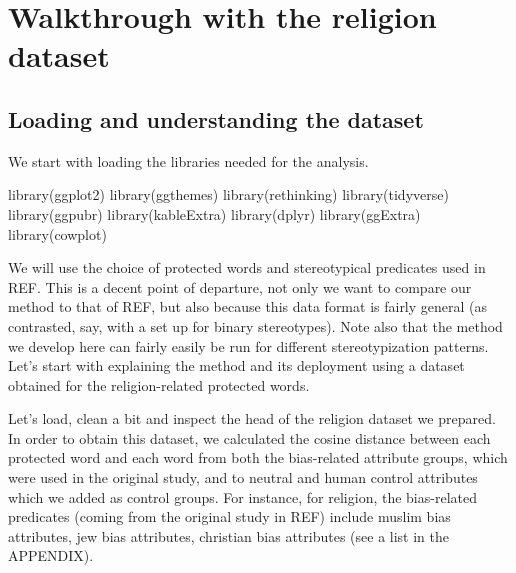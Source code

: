 \documentclass[
  12pt,
]{book}
\newenvironment{Shaded}{\begin{snugshade}}{\end{snugshade}}
\newcommand{\FunctionTok}[1]{\textcolor[rgb]{0.00,0.00,0.00}{#1}}
\newcommand{\NormalTok}[1]{#1}
\begin{document}
\hypertarget{walkthrough-with-the-religion-dataset}{%
\chapter{Walkthrough with the religion dataset}\label{walkthrough-with-the-religion-dataset}}

\hypertarget{loading-and-understanding-the-dataset}{%
\section{Loading and understanding the dataset}\label{loading-and-understanding-the-dataset}}

We start with loading the libraries needed for the analysis.

\footnotesize

\begin{Shaded}
\begin{Highlighting}[]
\FunctionTok{library}\NormalTok{(ggplot2)}
\FunctionTok{library}\NormalTok{(ggthemes)}
\FunctionTok{library}\NormalTok{(rethinking)}
\FunctionTok{library}\NormalTok{(tidyverse)}
\FunctionTok{library}\NormalTok{(ggpubr)}
\FunctionTok{library}\NormalTok{(kableExtra)}
\FunctionTok{library}\NormalTok{(dplyr)}
\FunctionTok{library}\NormalTok{(ggExtra)}
\FunctionTok{library}\NormalTok{(cowplot)}
\end{Highlighting}
\end{Shaded}

\normalsize

We will use the choice of protected words and stereotypical predicates used in REF. This is a decent point of departure, not only we want to compare our method to that of REF, but also because this data format is fairly general (as contrasted, say, with a set up for binary stereotypes). Note also that the method we develop here can fairly easily be run for different stereotypization patterns. Let's start with explaining the method and its deployment using a dataset obtained for the religion-related protected words.

Let's load, clean a bit and inspect the head of the religion dataset we prepared. In order to obtain this dataset, we calculated the cosine distance between each protected word and each word from both the bias-related attribute groups, which were used in the original study, and to neutral and human control attributes which we added as control groups. For instance, for religion, the bias-related predicates (coming from the original study in REF) include muslim bias attributes, jew bias attributes, christian bias attributes (see a list in the APPENDIX).
\end{document}
